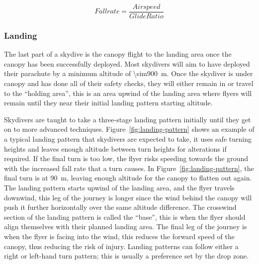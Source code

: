 \begin{equation}\label{eq:fallrate}
  Fallrate = \frac{Airspeed}{Glide Ratio}
\end{equation}

\subsubsection{Landing}
The last part of a skydive is the canopy flight to the landing area once the canopy has been successfully deployed. Most skydivers will aim to have deployed their parachute by a minimum altitude of \SI{\sim900}{\metre}.
Once the skydiver is under canopy and has done all of their safety checks, they will either remain in or travel to the ``holding area'', this is an area upwind of the landing area where flyers will remain until they near their initial landing pattern starting altitude.

Skydivers are taught to take a three-stage landing pattern initially until they get on to more advanced techniques. Figure~\vref{fig:landing-pattern} shows an example of a typical landing pattern that skydivers are expected to take, it uses safe turning heights and leaves enough altitude between turn heights for alterations if required. If the final turn is too low, the flyer risks speeding towards the ground with the increased fall rate that a turn causes. In Figure~\vref{fig:landing-pattern}, the final turn is at \SI{90}{\metre}, leaving enough altitude for the canopy to flatten out again. The landing pattern starts upwind of the landing area, and the flyer travels downwind, this leg of the journey is longer since the wind behind the canopy will push it further horizontally over the same altitude difference. The crosswind section of the landing pattern is called the ``base'', this is when the flyer should align themselves with their planned landing area. The final leg of the journey is when the flyer is facing into the wind, this reduces the forward speed of the canopy, thus reducing the risk of injury. Landing patterns can follow either a right or left-hand turn pattern; this is usually a preference set by the drop zone.

